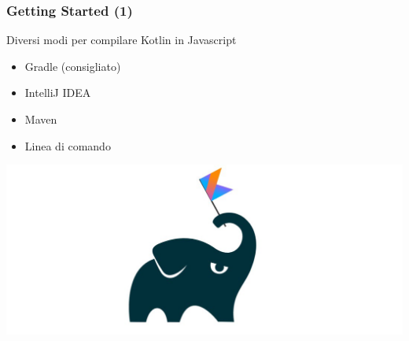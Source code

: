     \begin{frame}
      \frametitle{Getting Started (1)}
      \begin{block}{Diversi modi per compilare Kotlin in Javascript}
        \begin{itemize}
          \item \alert{Gradle} (consigliato)
          \item IntelliJ IDEA
          \item Maven
          \item Linea di comando
        \end{itemize}
      \end{block}
      \begin{center}
        \includegraphics[scale=0.2]{KtGradle}
      \end{center}
    \end{frame}

